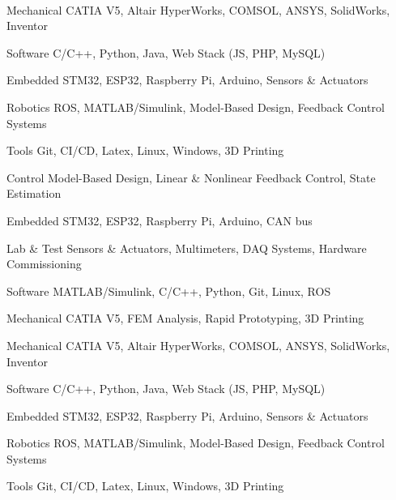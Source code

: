 \vspace{-\acvSectionTopSkip}

\begin{minipage}[t]{0.65\textwidth}

    \\

    \begin{cvskills}

        \ifdefined\IsMechanical
            \cvskill
            {Mechanical}
            {CATIA V5, Altair HyperWorks, COMSOL, ANSYS, SolidWorks, Inventor}

            \cvskill
            {Software}
            {C/C++, Python, Java, Web Stack (JS, PHP, MySQL)}

            \cvskill
            {Embedded}
            {STM32, ESP32, Raspberry Pi, Arduino, Sensors \& Actuators}

            \cvskill
            {Robotics}
            {ROS, MATLAB/Simulink, Model-Based Design, Feedback Control Systems}

            \cvskill
            {Tools}
            {Git, CI/CD, Latex, Linux, Windows, 3D Printing}
        \fi

        \ifdefined\IsMechatronics
            \cvskill
            {Control}
            {Model-Based Design, Linear \& Nonlinear Feedback Control, State Estimation}

            \cvskill
            {Embedded}
            {STM32, ESP32, Raspberry Pi, Arduino, CAN bus}

            \cvskill
            {Lab \& Test}
            {Sensors \& Actuators, Multimeters, DAQ Systems, Hardware Commissioning}

            \cvskill
            {Software}
            {MATLAB/Simulink, C/C++, Python, Git, Linux, ROS}

            \cvskill
            {Mechanical}
            {CATIA V5, FEM Analysis, Rapid Prototyping, 3D Printing}
        \fi

        \ifdefined\IsSuperconductivity
            \cvskill
            {Mechanical}
            {CATIA V5, Altair HyperWorks, COMSOL, ANSYS, SolidWorks, Inventor}

            \cvskill
            {Software}
            {C/C++, Python, Java, Web Stack (JS, PHP, MySQL)}

            \cvskill
            {Embedded}
            {STM32, ESP32, Raspberry Pi, Arduino, Sensors \& Actuators}

            \cvskill
            {Robotics}
            {ROS, MATLAB/Simulink, Model-Based Design, Feedback Control Systems}

            \cvskill
            {Tools}
            {Git, CI/CD, Latex, Linux, Windows, 3D Printing}
        \fi

    \end{cvskills}

\end{minipage}
